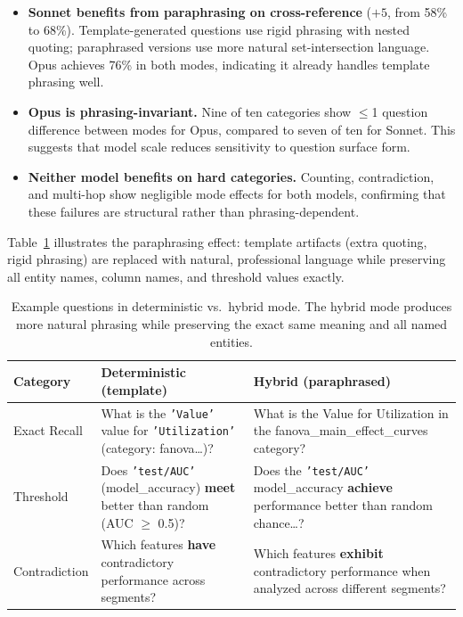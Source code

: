 \documentclass[11pt]{article}
\begin{document}
\begin{itemize}[leftmargin=2em]
  \item \textbf{Sonnet benefits from paraphrasing on cross-reference}
    ($+5$, from 58\% to 68\%).  Template-generated questions use rigid
    phrasing with nested quoting; paraphrased versions use more
    natural set-intersection language.  Opus achieves 76\% in both
    modes, indicating it already handles template phrasing well.
  \item \textbf{Opus is phrasing-invariant.}  Nine of ten categories
    show $\leq$1 question difference between modes for Opus, compared
    to seven of ten for Sonnet.  This suggests that model scale
    reduces sensitivity to question surface form.
  \item \textbf{Neither model benefits on hard categories.}  Counting,
    contradiction, and multi-hop show negligible mode effects for both
    models, confirming that these failures are structural rather than
    phrasing-dependent.
\end{itemize}

Table~\ref{tab:paraphrase_examples} illustrates the paraphrasing
effect: template artifacts (extra quoting, rigid phrasing) are replaced
with natural, professional language while preserving all entity names,
column names, and threshold values exactly.

\begin{table}[t]
\centering
\caption{Example questions in deterministic vs.\ hybrid mode.  The
hybrid mode produces more natural phrasing while preserving the exact
same meaning and all named entities.}
\label{tab:paraphrase_examples}
\small
\begin{tabular}{p{1.8cm}p{5.5cm}p{5.5cm}}
\toprule
Category & Deterministic (template) & Hybrid (paraphrased) \\
\midrule
Exact Recall &
  What is the \texttt{'Value'} value for \texttt{'Utilization'} (category: fanova\dots)? &
  What is the Value for Utilization in the fanova\_main\_effect\_curves category? \\[4pt]
Threshold &
  Does \texttt{'test/AUC'} (model\_accuracy) \textbf{meet} better than random (AUC $\geq$ 0.5)? &
  Does the \texttt{'test/AUC'} model\_accuracy \textbf{achieve} performance better than random chance\dots? \\[4pt]
Contradiction &
  Which features \textbf{have} contradictory performance across segments? &
  Which features \textbf{exhibit} contradictory performance when analyzed across different segments? \\
\bottomrule
\end{tabular}
\end{table}
\end{document}
